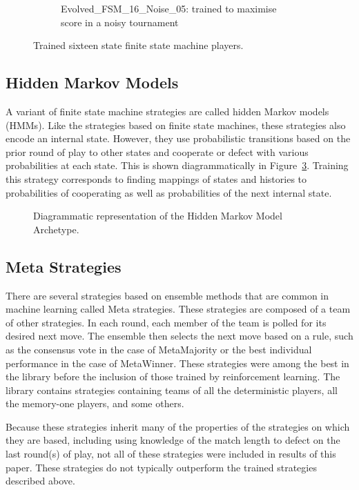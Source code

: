 \documentclass{article}
\begin{document}
\begin{figure}[!hbtp]
\begin{subfigure}[t]{.5\textwidth}
        \caption{Evolved\_FSM\_16\_Noise\_05: trained to maximise score in a
        noisy tournament}
        \label{fig:fsm16noise}
    \end{subfigure}%
    \caption{Trained sixteen state finite state machine players.}
    \label{fig:fsm_images}
\end{figure}


\subsection{Hidden Markov Models}

A variant of finite state machine strategies are called hidden Markov models
(HMMs). Like the strategies based on finite state machines, these strategies
also encode an internal state. However, they use probabilistic transitions based on the
prior round of play to other states and cooperate or defect with various
probabilities at each state. This is
shown diagrammatically in Figure~\ref{fig:hmm}. Training this strategy
corresponds to finding mappings of states and histories to probabilities of
cooperating as well as probabilities of the next internal state.

\begin{figure}[!hbtp]
    \centering
    
    \caption{Diagrammatic representation of the Hidden Markov Model Archetype.}
    \label{fig:hmm}
\end{figure}


\subsection{Meta Strategies}

There are several strategies based on ensemble methods that
are common in machine learning called Meta strategies. These strategies are
composed of a team of other strategies. In each round, each member of the team
is polled for its desired next
move. The ensemble then selects the next move based on a rule, such as the
consensus vote in the case of MetaMajority or the best individual performance
in the case of MetaWinner. These strategies were among the best in the library
before the inclusion of those trained by reinforcement learning. The library
contains strategies containing teams of all the deterministic players, all the
memory-one players, and some others.

Because these strategies inherit many of the properties of the strategies
on which they are based, including using knowledge of the match length to defect
on the last round(s) of play, not all of these
strategies were included in results of this
paper. These strategies do not typically outperform the trained strategies
described above.
\end{document}

